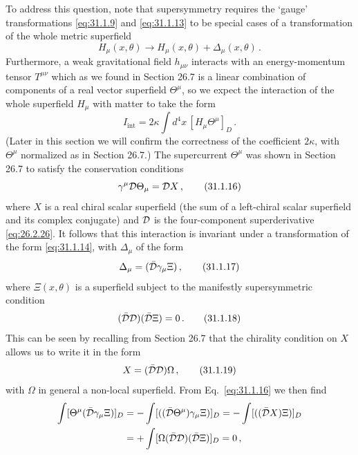 To address this question, note that supersymmetry requires the `gauge'
transformations \eqref{eq:31.1.9} and \eqref{eq:31.1.13} to be special cases
of a transformation of the whole metric superfield
\begin{equation}
  H_\mu(x,\theta)\to H_\mu(x,\theta)+\Delta_\mu(x,\theta)\,.
  \tag{31.1.14}\label{eq:31.1.14}
\end{equation}
Furthermore, a weak gravitational field \(h_{\mu\nu}\) interacts with an
energy-momentum tensor \(T^{\mu\nu}\) which as we found in Section 26.7 is a
linear combination of components of a real vector superfield \(\Theta^\mu\),
so we expect the interaction of the whole superfield \(H_\mu\) with matter to
take the form
\begin{equation}
  I_{\mathrm{int}}
  =2\kappa\int d^4x\,[H_\mu\Theta^\mu]_D\,.
  \tag{31.1.15}\label{eq:31.1.15}
\end{equation}
(Later in this section we will confirm the correctness of the coefficient
\(2\kappa\), with \(\Theta^\mu\) normalized as in Section 26.7.) The
supercurrent \(\Theta^\mu\) was shown in Section 26.7 to satisfy the
conservation conditions
\begin{equation}
  \gamma^\mu\mathcal{D}\Theta_\mu=\mathcal{D} X\,,
  \tag{31.1.16}\label{eq:31.1.16}
\end{equation}
where \(X\) is a real chiral scalar superfield (the sum of a left-chiral
scalar superfield and its complex conjugate) and \(\mathcal{D}\) is the
four-component superderivative \eqref{eq:26.2.26}. It follows that this
interaction is invariant under a transformation of the form
\eqref{eq:31.1.14}, with \(\Delta_\mu\) of the form
\begin{equation}
  \Delta_\mu=(\bar{\mathcal{D}}\gamma_\mu\Xi)\,,
  \tag{31.1.17}\label{eq:31.1.17}
\end{equation}
where \(\Xi(x,\theta)\) is a superfield subject to the manifestly
supersymmetric condition
\begin{equation}
  (\bar{\mathcal{D}}\mathcal{D})(\bar{\mathcal{D}}\Xi)=0\,.
  \tag{31.1.18}\label{eq:31.1.18}
\end{equation}
This can be seen by recalling from Section 26.7 that the chirality condition
on \(X\) allows us to write it in the form
\begin{equation}
  X=(\bar{\mathcal{D}}\mathcal{D})\Omega\,,
  \tag{31.1.19}\label{eq:31.1.19}
\end{equation}
with \(\Omega\) in general a non-local superfield. From
Eq.~\eqref{eq:31.1.16} we then find
\[
  \begin{aligned}
  \int[\Theta^\mu(\bar{\mathcal{D}}\gamma_\mu\Xi)]_D
  &=-\int[((\bar{\mathcal{D}}\Theta^\mu)\gamma_\mu\Xi)]_D
   =-\int[((\bar{\mathcal{D}}X)\Xi)]_D
  \\
  &=+\int[\Omega(\bar{\mathcal{D}}\mathcal{D})(\bar{\mathcal{D}}\Xi)]_D=0\,,
  \end{aligned}
\]
